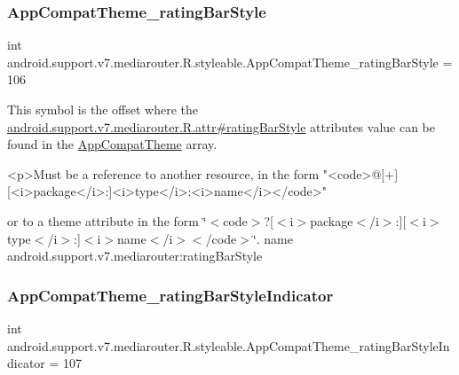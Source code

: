 \subsubsection{\texorpdfstring{App\+Compat\+Theme\+\_\+rating\+Bar\+Style}{AppCompatTheme\_ratingBarStyle}}
{\footnotesize\ttfamily int android.\+support.\+v7.\+mediarouter.\+R.\+styleable.\+App\+Compat\+Theme\+\_\+rating\+Bar\+Style = 106\hspace{0.3cm}{\ttfamily [static]}}

This symbol is the offset where the \hyperlink{classandroid_1_1support_1_1v7_1_1mediarouter_1_1R_1_1attr_a19ff1f11c2808ded29e99126ee9999ac}{android.\+support.\+v7.\+mediarouter.\+R.\+attr\#rating\+Bar\+Style} attribute\textquotesingle{}s value can be found in the \hyperlink{classandroid_1_1support_1_1v7_1_1mediarouter_1_1R_1_1styleable_a4e3d3900c75d49aeb2f283cac00214d6}{App\+Compat\+Theme} array.

\begin{DoxyVerb}      <p>Must be a reference to another resource, in the form "<code>@[+][<i>package</i>:]<i>type</i>:<i>name</i></code>"
\end{DoxyVerb}
 or to a theme attribute in the form \char`\"{}$<$code$>$?\mbox{[}$<$i$>$package$<$/i$>$\+:\mbox{]}\mbox{[}$<$i$>$type$<$/i$>$\+:\mbox{]}$<$i$>$name$<$/i$>$$<$/code$>$\char`\"{}.  name android.\+support.\+v7.\+mediarouter\+:rating\+Bar\+Style \mbox{\label{classandroid_1_1support_1_1v7_1_1mediarouter_1_1R_1_1styleable_adbfc1fbc4a808f8fe9c21f5cebc0979e}} 
\subsubsection{\texorpdfstring{App\+Compat\+Theme\+\_\+rating\+Bar\+Style\+Indicator}{AppCompatTheme\_ratingBarStyleIndicator}}
{\footnotesize\ttfamily int android.\+support.\+v7.\+mediarouter.\+R.\+styleable.\+App\+Compat\+Theme\+\_\+rating\+Bar\+Style\+Indicator = 107\hspace{0.3cm}{\ttfamily [static]}}


